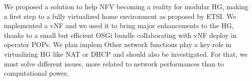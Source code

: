 We proposed a solution to help NFV becoming a reality for modular HG, making a first step to a fully virtualized home environment as proposed by ETSI.
We implemented a vNF and we used it to bring major enhancements to the HG, thanks to a small but efficient OSGi bundle collaborating with vNF deploy in operator POPs.
We plan implem
Other network functions play a key role in virtualizing HG like NAT or DHCP and should also be investigated.
For that, we must solve different issues, more related to network performances than to computational power. 



